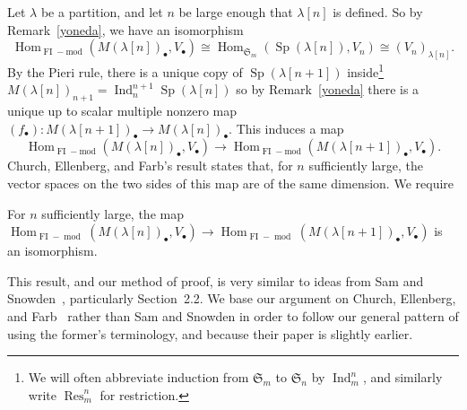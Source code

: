 \documentclass[ALCO,ThmDefs,Unicode,epreuves]{cedram}
\DeclareMathOperator{\FI}{FI}
\DeclareMathOperator{\module}{mod}
\DeclareMathOperator{\Hom}{Hom}
\DeclareMathOperator{\Res}{Res}
\DeclareMathOperator{\Ind}{Ind}
\DeclareMathOperator{\Sp}{Sp}
\newcommand{\Sn}{\mathfrak{S}}
\newcommand{\dt}{\bullet}
\begin{document}
Let $\lambda$ be a partition, and let $n$ be large enough that $\lambda[n]$ is defined. 
So by Remark~\ref{yoneda}, we have an isomorphism
\[ \Hom_{\FI-\text{mod}}(M(\lambda[n])_\dt, V_\dt) \cong \Hom_{\Sn_m}(\Sp(\lambda[n]),V_n)\cong (V_n)_{\lambda[n]} . \]
By the Pieri rule, there is a unique copy of $\Sp(\lambda[n+1])$ inside\footnote{We will often abbreviate induction from $\Sn_m$ to $\Sn_n$ by $\Ind_m^n$, and similarly write $\Res_m^n$ for restriction.} $M(\lambda[n])_{n+1} = \Ind_n^{n+1} \Sp(\lambda[n])$ so by Remark~\ref{yoneda} there is a unique up to scalar multiple nonzero map $(f_\dt): M(\lambda[n+1])_\dt \to M(\lambda[n])_\dt$. This induces a map $$\Hom_{\FI-\text{mod}}(M(\lambda[n])_\dt, V_\dt) \to \Hom_{\FI-\text{mod}}(M(\lambda[n+1])_\dt, V_\dt).$$
Church, Ellenberg, and Farb's result states that, for $n$ sufficiently large, the vector spaces on the two sides of this map are of the same dimension. 
We require
\begin{theorem} \label{stabilization}
For $n$ sufficiently large, the map $\Hom_{\FI-\module}(M(\lambda[n])_\dt, V_\dt) \to \Hom_{\FI-\module}(M(\lambda[n+1])_\dt, V_\dt)$ is an isomorphism. 
\end{theorem}

\begin{remark}
This result, and our method of proof, is very similar to ideas from Sam and Snowden~\cite{SS}, particularly Section~2.2. We base our argument on Church, Ellenberg, and Farb~\cite{CEF} rather than Sam and Snowden in order to follow our general pattern of using the former's terminology, and because their paper is slightly earlier.
\end{remark}
\end{document}
